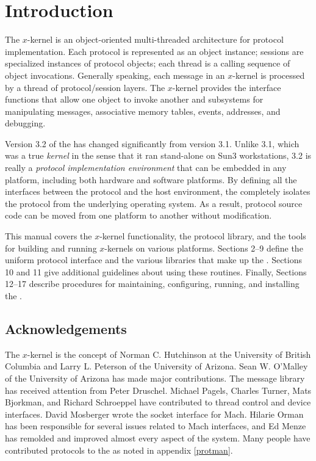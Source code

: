 \section{Introduction}


The $x$-kernel is an object-oriented multi-threaded architecture for
protocol implementation.  Each protocol is represented as an object
instance; sessions are specialized instances of protocol objects; each
thread is a calling sequence of object invocations.  Generally
speaking, each message in an $x$-kernel is processed by a thread of
protocol/session layers.  The $x$-kernel provides the interface
functions that allow one object to invoke another and subsystems for
manipulating messages, associative memory tables, events, addresses,
and debugging.

Version 3.2 of the \xk{} has changed significantly from version 3.1.
Unlike 3.1, which was a true {\it kernel} in the sense that it ran
stand-alone on Sun3 workstations, 3.2 is really a {\it protocol
implementation environment} that can be embedded in any platform,
including both hardware and software platforms. By defining all the
interfaces between the protocol and the host environment, the
\xk{} completely isolates the protocol from the underlying operating
system. As a result, protocol source code can be moved from one
platform to another without modification.

This manual covers the $x$-kernel functionality, the protocol library,
and the tools for building and running $x$-kernels on various
platforms. Sections 2--9 define the uniform protocol interface and the
various libraries that make up the \xk{}. Sections 10 and 11 give
additional guidelines about using these routines. Finally, Sections
12--17 describe procedures for maintaining, configuring, running, and
installing the \xk.

\subsection{Acknowledgements}

The $x$-kernel is the concept of Norman C. Hutchinson at the
University of British Columbia and Larry L.  Peterson of the
University of Arizona.  Sean W. O'Malley of the University of Arizona
has made major contributions.  The message library has received
attention from Peter Druschel.  Michael Pagels, Charles Turner, Mats
Bjorkman, and Richard Schroeppel have contributed to thread control
and device interfaces.  David Mosberger wrote the socket interface for
Mach.  Hilarie Orman has been responsible for several issues related
to Mach interfaces, and Ed Menze has remolded and improved almost
every aspect of the system.  Many people have contributed protocols
to the \xk{} as noted in appendix \ref{protman}.

